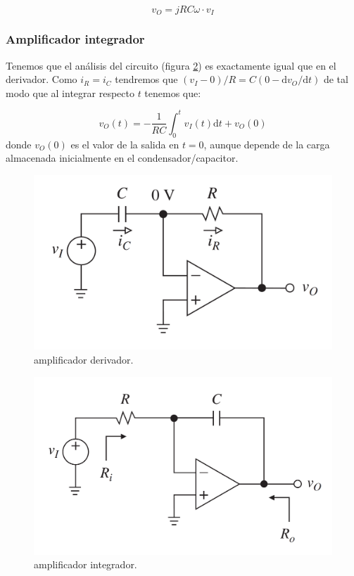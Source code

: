 \documentclass[12pt,a4paper]{article}
\numberwithin{equation}{section}
\numberwithin{figure}{section}
\newcommand{\D}{\mathrm{d}}
\begin{document}
\begin{equation}
v_O = jRC \omega  \cdot v_I  
\end{equation}


\subsubsection{Amplificador integrador}

Tenemos que el análisis del circuito (figura \ref{Fig:1.3.7-Amplificador-Integrador}) es exactamente igual que en el derivador. Como $i_R = i_C$ tendremos que $(v_I-0) / R = C  (0-\D v_O / \D t)$ de tal modo que al integrar respecto $t$ tenemos que:

\begin{equation}
v_O (t) = - \dfrac{1}{RC} \int_{0}^t v_I (t) \D t + v_O (0)
\end{equation}
donde $v_O (0)$ es el valor de la salida en $t=0$, aunque depende de la carga almacenada inicialmente en el condensador/capacitor. 


\begin{figure}[h!] \centering
\includegraphics[scale=0.3]{1.3.6-Derivador.png}
\caption{amplificador derivador.}
\label{Fig:1.3.6.-Amplificador-Derivador}
\end{figure} 


\begin{figure}[h!] \centering
\includegraphics[scale=0.3]{1.3.7-Integrador.png}
\caption{amplificador integrador.}
\label{Fig:1.3.7-Amplificador-Integrador}
\end{figure} 
\end{document}
